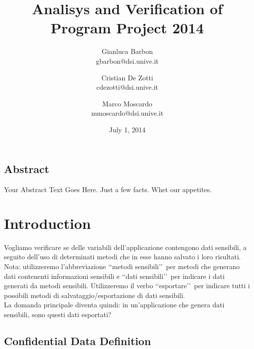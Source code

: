 \documentclass[letterpaper,twocolumn,10pt]{article}
\begin{document}
\title{\Large \bf Analisys and Verification of Program Project 2014}

\author{
{\rm Gianluca Barbon}\\
gbarbon@dsi.unive.it
\and
{\rm Cristian De Zotti}\\
cdezotti@dsi.unive.it
\and
{\rm Marco Moscardo}\\
mmoscardo@dsi.unive.it
}
\date{July 1, 2014}
\maketitle

\thispagestyle{empty}


\subsection*{Abstract}
Your Abstract Text Goes Here.  Just a few facts.
Whet our appetites.



\section{Introduction}
\paragraph{}
Vogliamo verificare se delle variabili dell'applicazione contengono dati sensibili, a seguito dell'uso di determinati metodi che in esse hanno salvato i loro risultati.\\ 
Nota: utilizzeremo l'abbreviazione \lq\lq metodi sensibili\rq\rq\ per metodi che generano dati contenenti informazioni sensibili e \lq\lq dati sensibili\rq\rq\ per indicare i dati generati da metodi sensibili. Utilizzeremo il verbo \lq\lq esportare\rq\rq\ per indicare tutti i possibili metodi di salvataggio/esportazione di dati sensibili. \\
La domanda principale diventa quindi: in un'applicazione che genera dati sensibili, sono questi dati esportati? \\
\subsection{Confidential Data Definition}
\end{document}
